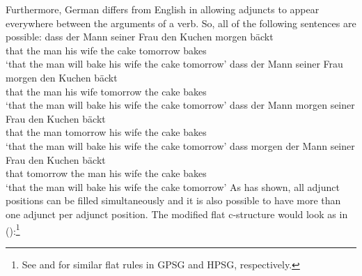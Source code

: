 Furthermore, German differs from English in allowing adjuncts to appear everywhere between the
arguments of a verb. So, all of the following sentences are possible:
\eal
\ex 
\gll dass der Mann seiner Frau den Kuchen morgen bäckt\\
     that the man  his    wife the cake   tomorrow bakes\\
\glt `that the man will bake his wife the cake tomorrow'
\ex 
\gll dass der Mann seiner Frau morgen den Kuchen bäckt\\
     that the man  his    wife tomorrow the cake   bakes\\
\glt `that the man will bake his wife the cake tomorrow'
\ex 
\gll dass der Mann morgen seiner Frau den Kuchen bäckt\\
     that the man  tomorrow  his    wife the cake   bakes\\
\glt `that the man will bake his wife the cake tomorrow'
\ex 
\gll dass morgen der Mann seiner Frau den Kuchen bäckt\\
     that tomorrow the man  his    wife the cake    bakes\\
\glt `that the man will bake his wife the cake tomorrow'
\zl
As \citet{Uszkoreit87a} has shown, all adjunct positions can be filled simultaneously and it is also
possible to have more than one adjunct per adjunct position. The modified flat c-structure would
look as in ():\footnote{%
  See \citet[]{Uszkoreit87a} and \citet{Kasper94a} for similar flat rules in GPSG and HPSG,
  respectively.
}
\ea\label{c-struc-vp-benefactive-resultative-optional-args-adjuncts}
